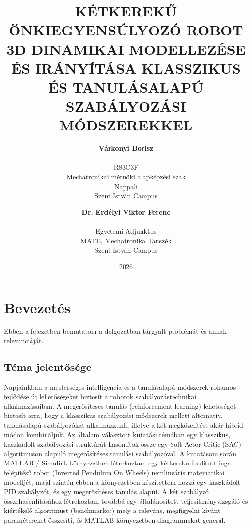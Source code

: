 \documentclass[12pt,a4paper]{report}
\begin{document}
	
	\title{KÉTKEREKŰ ÖNKIEGYENSÚLYOZÓ ROBOT 3D DINAMIKAI MODELLEZÉSE ÉS IRÁNYÍTÁSA KLASSZIKUS ÉS TANULÁSALAPÚ SZABÁLYOZÁSI MÓDSZEREKKEL}
	
	\author{
		\textbf{Várkonyi Borisz}\\\\
		R83C3F \\
		Mechatronikai mérnöki alapképzési szak \\
		Nappali \\
		Szent István Campus
		\and
		\textbf{Dr. Erdélyi Viktor Ferenc}\\\\
		Egyetemi Adjunktus \\
		MATE, Mechatronika Tanszék\\
		Szent István Campus
	}
	\date{2026}
	
	\maketitle
	
	\chapter{Bevezetés}
	
	Ebben a fejezetben bemutatom a dolgozatban tárgyalt problémát és annak relevanciáját.
	
	\section{Téma jelentősége}
	
	Napjainkban a mesterséges intelligencia és a tanulásalapú módszerek rohamos fejlődése új lehetőségeket biztosít a robotok szabályozástechnikai alkalmazásaiban. A megerősítéses tanulás (reinforcement learning) lehetőséget biztosít arra, hogy a klasszikus szabályozási módszerek mellett alternatív, tanulásalapú szabályozókat alkalmazzunk, illetve a két megközelítést akár hibrid módon kombináljuk.
	\newline
	\newline
	Az általam választott kutatási témában egy klasszikus, kaszkádolt szabályozási struktúrát hasonlítok össze egy Soft Actor-Critic (SAC) algoritmuson alapuló megerősítéses tanulási szabályozóval.
	\newline
	\newline
	A kutatásom során MATLAB / Simulink környezetben létrehoztam egy kétkerekű fordított inga felépítésű robot (Inverted Pendulum On Wheels) nemlineáris matematikai modelljét, majd szintén ebben a környezetben készítettem hozzá egy kaszkádolt PID szabályzót, és egy megerősítéses tanulás alapút. A két szabályzó összehasonlításához létrehoztam továbbá egy általánosított teljesítményvizsgáló és kiértékelő algoritmust (benchmarkot) mely a releváns, megfigyelni kívánt paramétereket összesíti, és MATLAB környezetben diagrammokat generál.
	\newline
	\newline
\end{document}
